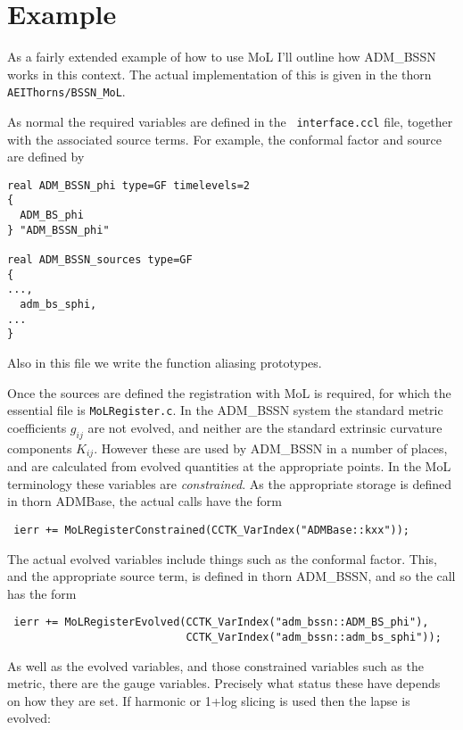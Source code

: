 \section{Example}
\label{CactusBase_MoL_sec:example}

As a fairly extended example of how to use MoL I'll outline how
ADM\_BSSN works in this context. The actual implementation of this is
given in the thorn {\tt AEIThorns/BSSN\_MoL}.

As normal the required variables are defined in the {\tt
  interface.ccl} file, together with the associated source terms. For
example, the conformal factor and source are defined by

\begin{verbatim}
real ADM_BSSN_phi type=GF timelevels=2
{
  ADM_BS_phi
} "ADM_BSSN_phi"

real ADM_BSSN_sources type=GF
{
...,
  adm_bs_sphi,
...
}
\end{verbatim}
Also in this file we write the function aliasing prototypes.

Once the sources are defined the registration with MoL is required,
for which the essential file is {\tt MoLRegister.c}. In the ADM\_BSSN
system the standard metric coefficients $g_{ij}$ are not evolved, and
neither are the standard extrinsic curvature components $K_{ij}$.
However these are used by ADM\_BSSN in a number of places, and are
calculated from evolved quantities at the appropriate points.  In the
MoL terminology these variables are {\it constrained}. As the
appropriate storage is defined in thorn ADMBase, the actual calls have
the form

\begin{verbatim}
 ierr += MoLRegisterConstrained(CCTK_VarIndex("ADMBase::kxx"));
\end{verbatim}

\noindent The actual evolved variables include things such as the
conformal factor. This, and the appropriate source term, is defined in
thorn ADM\_BSSN, and so the call has the form

\begin{verbatim} 
 ierr += MoLRegisterEvolved(CCTK_VarIndex("adm_bssn::ADM_BS_phi"),
                            CCTK_VarIndex("adm_bssn::adm_bs_sphi")); 
\end{verbatim}


As well as the evolved variables, and those constrained variables such
as the metric, there are the gauge variables. Precisely what status
these have depends on how they are set. If harmonic or 1+log slicing
is used then the lapse is evolved:


